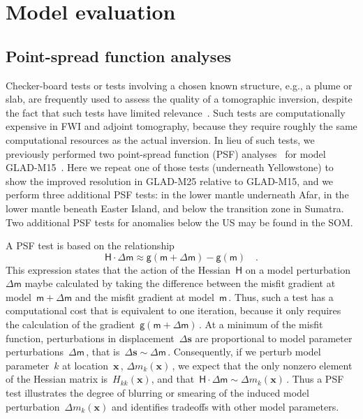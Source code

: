 \documentclass[extra,mreferee]{gji}
\begin{document}
\section{Model evaluation}
\label{section:evaluation}


\subsection{Point-spread function analyses}

Checker-board tests or tests involving a chosen known structure, e.g., a plume or slab,
are frequently used to assess the quality of a tomographic inversion,
despite the fact that such tests have limited relevance~\citep[e.g.,][]{Leveque1993}.
Such tests are computationally expensive in FWI and adjoint tomography, because they
require roughly the same computational resources as the actual inversion.
In lieu of such tests, we previously performed two point-spread function (PSF) analyses~\citep{fichtner2011resolution}
for model GLAD-M15~\citep{bozdaug2016global}.
Here we repeat one of those tests (underneath Yellowstone) to show the improved resolution in GLAD-M25 relative to GLAD-M15,
and we perform three additional PSF tests: in the lower mantle underneath Afar, in the lower mantle beneath Easter Island, and below the transition zone in Sumatra.
Two additional PSF tests for anomalies below the US may be found in the SOM.

A PSF test is based on the relationship
\begin{equation}
    \mathsf{H}\cdot\mathsf{\Delta}\mathsf{m}\approx\mathsf{g}(\mathsf{m}+\mathsf{\Delta}\mathsf{m})-\mathsf{g}(\mathsf{m})
    \quad .
\end{equation}
This expression states that the action of the Hessian~$\mathsf{H}$ on a model perturbation~$\mathsf{\Delta}\mathsf{m}$ maybe calculated by taking the difference between the misfit gradient at model~$\mathsf{m}+\mathsf{\Delta}\mathsf{m}$ and the misfit gradient at model~$\mathsf{m}$\,.
Thus, such a test has a computational cost that is equivalent to one iteration, because it only requires the calculation of the gradient~$\mathsf{g}(\mathsf{m}+\mathsf{\Delta}\mathsf{m})$\,.
At a minimum of the misfit function,
perturbations in displacement~$\Delta\mathbf{s}$ are proportional to model parameter perturbations~$\mathsf{\Delta}\mathsf{m}$\,, that is~$\Delta\mathbf{s}\sim\mathsf{\Delta}\mathsf{m}$\,.
Consequently, if we perturb model parameter~$k$ at location~$\mathbf{x}$\,,
$\Delta m_k(\mathbf{x})$\,,
we expect that the only nonzero element of the Hessian matrix is~$H_{kk}(\mathbf{x})$, and that~$\mathsf{H}\cdot\mathsf{\Delta}\mathsf{m}\sim\Delta m_k(\mathbf{x})$\,.
Thus a PSF test illustrates the degree of blurring or smearing of the induced model perturbation~$\Delta m_k(\mathbf{x})$ and identifies tradeoffs with other model parameters.
\end{document}
